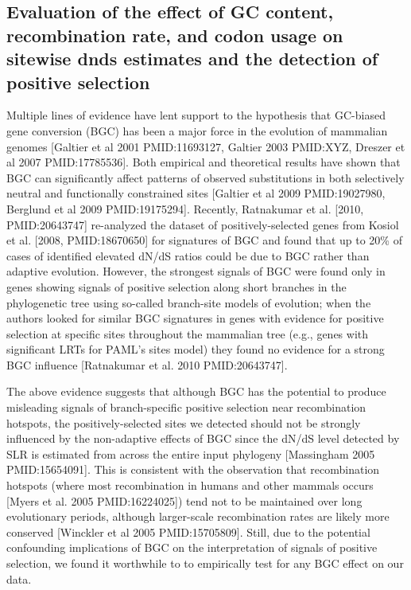\subsection{Evaluation of the effect of GC content, recombination rate, and codon usage on sitewise dnds estimates and the detection of positive selection}


 Multiple lines of evidence have lent support to the hypothesis that
 GC-biased gene conversion (BGC) has been a major force in the
 evolution of mammalian genomes [Galtier et al 2001 PMID:11693127,
   Galtier 2003 PMID:XYZ, Dreszer et al 2007 PMID:17785536]. Both
 empirical and theoretical results have shown that BGC can
 significantly affect patterns of observed substitutions in both
 selectively neutral and functionally constrained sites [Galtier et al
   2009 PMID:19027980, Berglund et al 2009 PMID:19175294]. Recently,
 Ratnakumar et al. [2010, PMID:20643747] re-analyzed the dataset of
 positively-selected genes from Kosiol et al. [2008, PMID:18670650]
 for signatures of BGC and found that up to 20\% of cases of
 identified elevated dN/dS ratios could be due to BGC rather than
 adaptive evolution. However, the strongest signals of BGC were found
 only in genes showing signals of positive selection along short
 branches in the phylogenetic tree using so-called branch-site models
 of evolution; when the authors looked for similar BGC signatures in
 genes with evidence for positive selection at specific sites
 throughout the mammalian tree (e.g., genes with significant LRTs for
 PAML’s sites model) they found no evidence for a strong BGC influence
 [Ratnakumar et al. 2010 PMID:20643747].

The above evidence suggests that although BGC has the potential to
produce misleading signals of branch-specific positive selection near
recombination hotspots, the positively-selected sites we detected
should not be strongly influenced by the non-adaptive effects of BGC
since the dN/dS level detected by SLR is estimated from across the
entire input phylogeny [Massingham 2005 PMID:15654091]. This is
consistent with the observation that recombination hotspots (where
most recombination in humans and other mammals occurs [Myers et
  al. 2005 PMID:16224025]) tend not to be maintained over long
evolutionary periods, although larger-scale recombination rates are
likely more conserved [Winckler et al 2005 PMID:15705809]. Still, due
to the potential confounding implications of BGC on the interpretation
of signals of positive selection, we found it worthwhile to to
empirically test for any BGC effect on our data.

